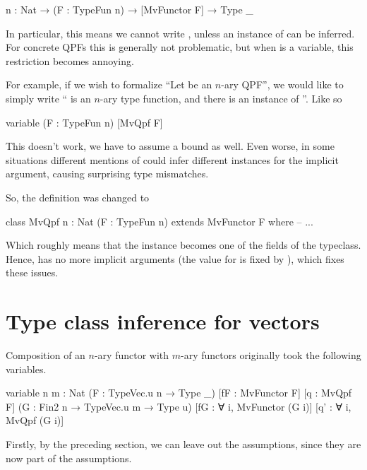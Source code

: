 \begin{leancode}
    {n : Nat} → (F : TypeFun n) → [MvFunctor F] → Type _
\end{leancode}
In particular, this means we cannot write , unless an instance of  can be inferred. For concrete QPFs this is generally not problematic, but when  is a variable, this restriction becomes annoying. 

For example, if we wish to formalize ``Let  be an $n$-ary QPF'', we would like to simply write `` is an $n$-ary type function, and there is an instance of ''. Like so
\begin{leancode}
    variable (F : TypeFun n) [MvQpf F]
\end{leancode}

This doesn't work, we have to assume a \lean{[MvFunctor F]} bound as well.
Even worse, in some situations different mentions of  could infer different  instances for the implicit argument, causing surprising type mismatches.

So, the definition was changed to 
\begin{leancode}
    class MvQpf {n : Nat} (F : TypeFun n) extends MvFunctor F where
        -- ...
\end{leancode}

Which roughly means that the  instance becomes one of the fields of the 
typeclass. Hence,  has no more implicit arguments (the value for  is fixed by ), 
which fixes these issues.


\section{Type class inference for vectors}

Composition of an $n$-ary functor  with $m$-ary functors  originally took the following variables.

\begin{leancode}
    variable {n m : Nat} 
             (F : TypeVec.{u} n → Type _) 
             [fF : MvFunctor F] 
             [q : MvQpf F] 
             (G : Fin2 n → TypeVec.{u} m → Type u)
             [fG : ∀ i, MvFunctor (G i)] 
             [q' : ∀ i, MvQpf (G i)]
\end{leancode}

Firstly, by the preceding section, we can leave out the  assumptions, since they are now part of the  assumptions.

